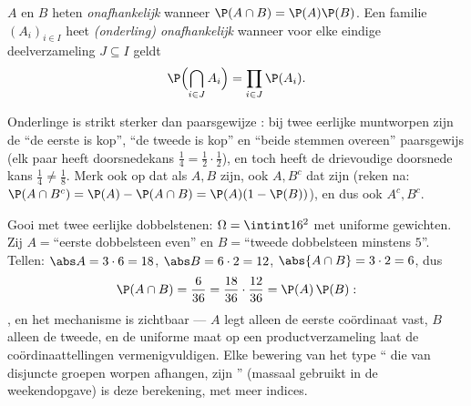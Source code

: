 \begin{definition}[Onafhankelijkheid]\label{def:b2:proba:independence}
 $A$ en $B$ heten
\emph{onafhankelijk} wanneer
$\P(A \cap B) = \P(A)\P(B)$. Een familie $(A_i)_{i \in I}$
 heet \emph{(onderling) onafhankelijk} wanneer voor
elke eindige deelverzameling $J \subseteq I$ geldt
\[
\P\Bigl(\bigcap_{i \in J} A_i\Bigr)
= \prod_{i \in J} \P(A_i) .
\]
\end{definition}

\begin{remark}
Onderlinge  is strikt sterker dan paarsgewijze
: bij twee eerlijke muntworpen zijn de
 ``de eerste is kop'', ``de tweede is kop'' en
``beide stemmen overeen'' paarsgewijs  (elk paar heeft
doorsnedekans $\frac14 = \frac12\cdot\frac12$), en toch heeft de
drievoudige doorsnede kans $\frac14 \neq \frac18$. Merk ook op dat
als $A, B$  zijn, ook $A, B^c$ dat zijn (reken na:
$\P(A \cap B^c) = \P(A) - \P(A\cap B) = \P(A)(1 - \P(B))$), en dus
ook $A^c, B^c$.
\end{remark}

\begin{example}\label{ex:b2:proba:productindep}
Gooi met twee eerlijke dobbelstenen: $\Omega = \intint16^2$ met
uniforme gewichten. Zij $A = {}$``eerste dobbelsteen even'' en $B =
{}$``tweede dobbelsteen minstens $5$''. Tellen: $\abs A = 3\cdot6 =
18$, $\abs B = 6\cdot2 = 12$, $\abs{A\cap B} = 3\cdot2 = 6$, dus
\[
\P(A\cap B) = \frac6{36} = \frac{18}{36}\cdot\frac{12}{36} =
\P(A)\,\P(B) :
\]
, en het mechanisme is zichtbaar --- $A$ legt alleen
de eerste coördinaat vast, $B$ alleen de tweede, en de uniforme
maat op een productverzameling laat de coördinaattellingen
vermenigvuldigen. Elke bewering van het type `` die
van disjuncte groepen worpen afhangen, zijn ''
(massaal gebruikt in de weekendopgave) is deze berekening, met meer
indices.
\end{example}

